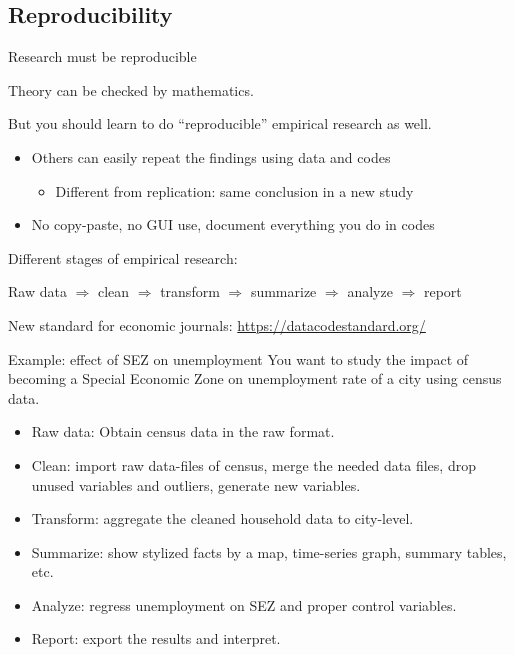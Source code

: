 \documentclass[handout]{beamer}
\begin{document}
\subsection{Reproducibility}

\begin{frame}{Research must be reproducible}

Theory can be checked by mathematics.\bigskip

But you should learn to do ``reproducible'' empirical research as well.

\begin{itemize}
	\item Others can easily repeat the findings using data and codes
	\begin{itemize}
		\item Different from replication: same conclusion in a new study
	\end{itemize}
	\item No copy-paste, no GUI use, document everything you do in codes
\end{itemize}\bigskip

Different stages of empirical research:\medskip

Raw data $\Rightarrow$ clean $\Rightarrow$ transform $\Rightarrow$ summarize $\Rightarrow$ analyze $\Rightarrow$ report\bigskip

New standard for economic journals: \url{https://datacodestandard.org/}
\end{frame}

\begin{frame}{Example: effect of SEZ on unemployment}
You want to study the impact of becoming a Special Economic Zone on unemployment rate of a city using census data.
\begin{itemize}
	\item Raw data: Obtain census data in the raw format.
	\item Clean: import raw data-files of census, merge the needed data files, drop unused variables and outliers, generate new variables.
	\item Transform: aggregate the cleaned household data to city-level.
	\item Summarize: show stylized facts by a map, time-series graph, summary tables, etc.
	\item Analyze: regress unemployment on SEZ and proper control variables.
	\item Report: export the results and interpret.
\end{itemize}

\end{frame}
\end{document}
